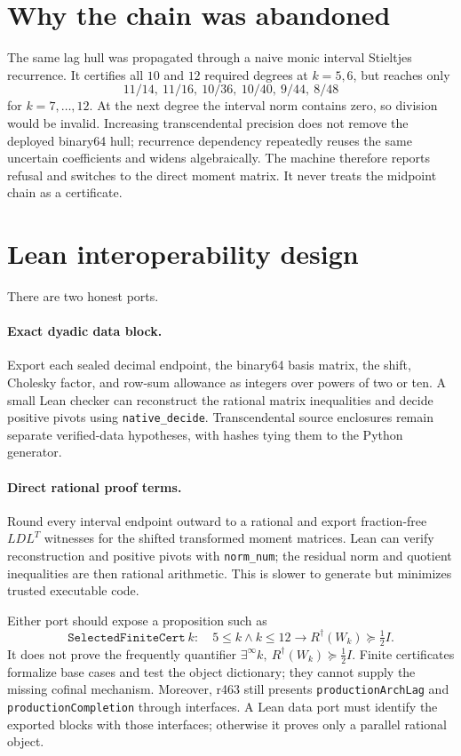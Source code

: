 \documentclass[11pt]{article}
\theoremstyle{remark}
\newcommand{\Rd}{R^{\dagger}}
\begin{document}
\section{Why the chain was abandoned}

The same lag hull was propagated through a naive monic interval
Stieltjes recurrence.  It certifies all $10$ and $12$ required degrees
at $k=5,6$, but reaches only
\[
 11/14,\ 11/16,\ 10/36,\ 10/40,\ 9/44,\ 8/48
\]
for $k=7,\ldots,12$.  At the next degree the interval norm contains
zero, so division would be invalid.  Increasing transcendental
precision does not remove the deployed binary64 hull; recurrence
dependency repeatedly reuses the same uncertain coefficients and
widens algebraically.  The machine therefore reports refusal and
switches to the direct moment matrix.  It never treats the midpoint
chain as a certificate.

\section{Lean interoperability design}

There are two honest ports.

\paragraph{Exact dyadic data block.}
Export each sealed decimal endpoint, the binary64 basis matrix, the
shift, Cholesky factor, and row-sum allowance as integers over powers
of two or ten.  A small Lean checker can reconstruct the rational
matrix inequalities and decide positive pivots using
\texttt{native\_decide}.  Transcendental source enclosures remain
separate verified-data hypotheses, with hashes tying them to the
Python generator.

\paragraph{Direct rational proof terms.}
Round every interval endpoint outward to a rational and export
fraction-free $LDL^T$ witnesses for the shifted transformed moment
matrices.  Lean can verify reconstruction and positive pivots with
\texttt{norm\_num}; the residual norm and quotient inequalities are
then rational arithmetic.  This is slower to generate but minimizes
trusted executable code.

Either port should expose a proposition such as
\[
 \texttt{SelectedFiniteCert}\ k:
 \quad 5\le k\land k\le12\longrightarrow
 \Rd(W_k)\succeq\tfrac12I .
\]
It does not prove the frequently quantifier
$\exists^\infty k,\ \Rd(W_k)\succeq\tfrac12I$.
Finite certificates formalize base cases and test the object
dictionary; they cannot supply the missing cofinal mechanism.
Moreover, r463 still presents \texttt{productionArchLag} and
\texttt{productionCompletion} through interfaces.  A Lean data port
must identify the exported blocks with those interfaces; otherwise it
proves only a parallel rational object.
\end{document}

